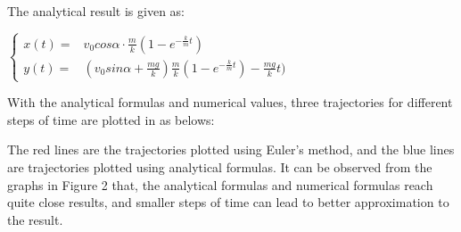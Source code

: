 \documentclass{article}
\begin{document}
\quad The analytical result is given as:

\quad $\begin{cases}
    x(t)= & v_{0}cos\alpha \cdot \frac{m}{k}(1-e^{-\frac{k}{m}t})                          \\
    y(t)= & (v_{0}sin\alpha + \frac{mg}{k})\frac{m}{k}(1-e^{-\frac{k}{m}t})-\frac{mg}{k}t)
  \end{cases}$

With the analytical formulas and numerical values, three trajectories for different steps of time are plotted in as belows:

The red lines are the trajectories plotted using Euler's method, and the blue lines are trajectories plotted using analytical formulas. It can be observed from the graphs in Figure 2 that, the analytical formulas and numerical formulas reach quite close results, and smaller steps of time can lead to better approximation to the result.
\end{document}
